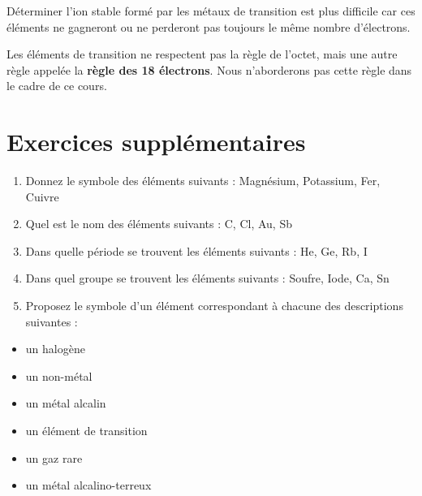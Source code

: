 \documentclass[
  11pt,
  a4paper,
  openany]{book}
\providecommand{\tightlist}{%
  \setlength{\itemsep}{0pt}\setlength{\parskip}{0pt}}
\begin{document}
Déterminer l'ion stable formé par les métaux de transition est plus difficile car ces éléments ne gagneront ou ne perderont pas toujours le même nombre d'électrons.

Les éléments de transition ne respectent pas la règle de l'octet, mais une autre règle appelée la \textbf{règle des 18 électrons}. Nous n'aborderons pas cette règle dans le cadre de ce cours.

\newpage

\hypertarget{exercices-suppluxe9mentaires-4}{%
\section{Exercices supplémentaires}\label{exercices-suppluxe9mentaires-4}}

\begin{Exercise}

\begin{enumerate}
\def\labelenumi{\arabic{enumi}.}
\tightlist
\item
  Donnez le symbole des éléments suivants :
  Magnésium, Potassium, Fer, Cuivre\\
\item
  Quel est le nom des éléments suivants :
  C, Cl, Au, Sb\\
\item
  Dans quelle période se trouvent les éléments suivants :
  He, Ge, Rb, I\\
\item
  Dans quel groupe se trouvent les éléments suivants :
  Soufre, Iode, Ca, Sn\\
\item
  Proposez le symbole d'un élément correspondant à chacune des descriptions suivantes :
\end{enumerate}

\begin{itemize}
\tightlist
\item
  un halogène
\item
  un non-métal
\item
  un métal alcalin
\item
  un élément de transition
\item
  un gaz rare
\item
  un métal alcalino-terreux
\end{itemize}

\end{Exercise}
\end{document}
